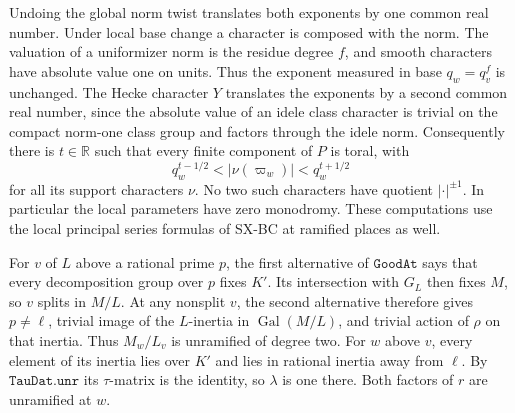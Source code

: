 Undoing the global norm twist translates both exponents by
one common real number. Under local base change a character
is composed with the norm. The valuation of a uniformizer norm
is the residue degree $f$, and smooth characters have absolute
value one on units. Thus the exponent measured in base $q_w=q_v^f$
is unchanged. The Hecke character $Y$ translates the exponents
by a second common real number, since the absolute value of an
idele class character is trivial on the compact norm-one class
group and factors through the idele norm. Consequently there
is $t\in\mathbb R$ such that every finite component of $P$ is
toral, with
\[
   q_w^{t-1/2}<|\nu(\varpi_w)|<q_w^{t+1/2}
\]
for all its support characters $\nu$. No two such characters
have quotient $|\cdot|^{\pm1}$. In particular the local parameters
have zero monodromy. These computations use the local principal
series formulas of SX-BC at ramified places as well.

For $v$ of $L$ above a rational prime $p$, the first alternative
of $\texttt{GoodAt}$ says that every decomposition group over $p$
fixes $K'$. Its intersection with $G_L$ then fixes $M$, so $v$
splits in $M/L$. At any nonsplit $v$, the second alternative
therefore gives $p\ne\ell$, trivial image of the $L$-inertia in
$\operatorname{Gal}(M/L)$, and trivial action of $\rho$ on that
inertia. Thus $M_w/L_v$ is unramified of degree two. For $w$
above $v$, every element of its inertia lies over $K'$ and lies
in rational inertia away from $\ell$. By $\texttt{TauDat.unr}$
its $\tau$-matrix is the identity, so $\lambda$ is one there.
Both factors of $r$ are unramified at $w$.

